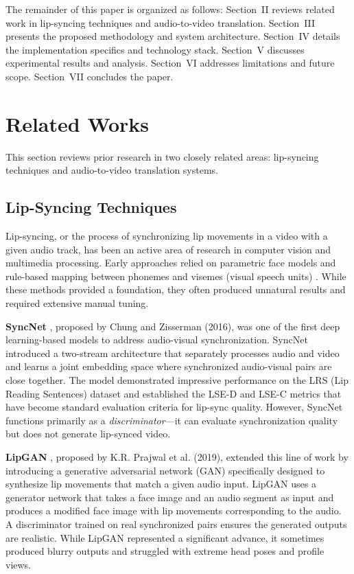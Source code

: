 \documentclass[conference]{IEEEtran}
\begin{document}
The remainder of this paper is organized as follows: Section~II reviews related work in lip-syncing techniques and audio-to-video translation. Section~III presents the proposed methodology and system architecture. Section~IV details the implementation specifics and technology stack. Section~V discusses experimental results and analysis. Section~VI addresses limitations and future scope. Section~VII concludes the paper.

\section{Related Works}

This section reviews prior research in two closely related areas: lip-syncing techniques and audio-to-video translation systems.

\subsection{Lip-Syncing Techniques}

Lip-syncing, or the process of synchronizing lip movements in a video with a given audio track, has been an active area of research in computer vision and multimedia processing. Early approaches relied on parametric face models and rule-based mapping between phonemes and visemes (visual speech units) \cite{b6}. While these methods provided a foundation, they often produced unnatural results and required extensive manual tuning.

\textbf{SyncNet} \cite{b7}, proposed by Chung and Zisserman (2016), was one of the first deep learning-based models to address audio-visual synchronization. SyncNet introduced a two-stream architecture that separately processes audio and video and learns a joint embedding space where synchronized audio-visual pairs are close together. The model demonstrated impressive performance on the LRS (Lip Reading Sentences) dataset and established the LSE-D and LSE-C metrics that have become standard evaluation criteria for lip-sync quality. However, SyncNet functions primarily as a \textit{discriminator}---it can evaluate synchronization quality but does not generate lip-synced video.

\textbf{LipGAN} \cite{b8}, proposed by K.R. Prajwal et al. (2019), extended this line of work by introducing a generative adversarial network (GAN) specifically designed to synthesize lip movements that match a given audio input. LipGAN uses a generator network that takes a face image and an audio segment as input and produces a modified face image with lip movements corresponding to the audio. A discriminator trained on real synchronized pairs ensures the generated outputs are realistic. While LipGAN represented a significant advance, it sometimes produced blurry outputs and struggled with extreme head poses and profile views.
\end{document}
